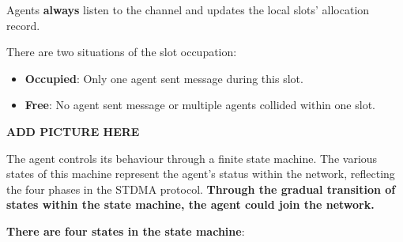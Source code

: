 Agents \textbf{always} listen to the channel and updates the local slots' allocation record.

There are two situations of the slot occupation:
\begin{itemize}
    \item \textbf{Occupied}: Only one agent sent message during this slot.
    \item \textbf{Free}: No agent sent message or multiple agents collided within one slot.
\end{itemize}

\textbf{ADD PICTURE HERE}  %

The agent controls its behaviour through a finite state machine. 
The various states of this machine represent the agent's status within the network, reflecting the four phases in the STDMA protocol.
\textbf{Through the gradual transition of states within the state machine, the agent could join the network.}

\textbf{There are four states in the state machine}:

